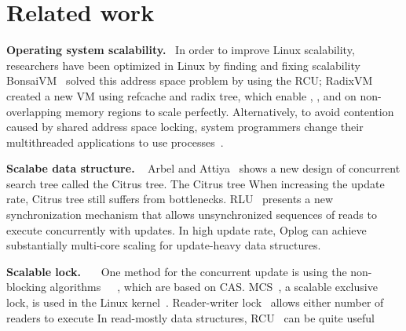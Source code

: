 \section{Related work} \label{sec:RelatedWork}
\noindent
\textbf{Operating system scalability.}
~\cite{Clements15SCR}In order to improve Linux scalability, researchers have
been optimized in Linux by finding and fixing scalability
BonsaiVM~\cite{AustinTClements2012RCUBalancedTrees} solved this address space
problem by using the RCU;
RadixVM~\cite{Clements2013RadixVM} created a new VM using refcache and radix
tree, which enable , , and  on
non-overlapping memory regions to scale perfectly.
Alternatively, to avoid contention caused by shared address space locking,
system programmers change their multithreaded applications to use
processes~\cite{SilasBoydWickizer2010LinuxScales48}.

\noindent
\textbf{Scalabe data structure.}
~\cite{Dodds2015SCT} Arbel and Attiya~\cite{Arbel2014ConcurrentRCU} shows a new
design of concurrent search tree called the Citrus tree. The Citrus tree
When increasing the update rate, Citrus tree still suffers from bottlenecks.
RLU~\cite{Matveev2015RLU} presents a new synchronization mechanism that allows
unsynchronized sequences of reads to execute concurrently with updates.
In high update rate, Oplog can achieve substantially multi-core scaling for
update-heavy data structures.

\noindent
\textbf{Scalable lock.}
~\cite{Wang2016BeMyGuest}~\cite{Bueso2015STP}~\cite{Bueso2014MCS}One method for
the concurrent update is using the non-blocking algorithms~\cite{Harris2001Lockfree}~\cite{Fomitchev2004Lockfree}~\cite{Timnat2012},
 which are based on CAS.
MCS~\cite{MellorCrummey91}, a scalable exclusive lock, is used in the Linux
kernel~\cite{MCSLocksKernel}.
Reader-writer lock~\cite{Courtois71} allows either number of readers to execute
In read-mostly data structures, RCU~\cite{McKenney98} can be quite useful


